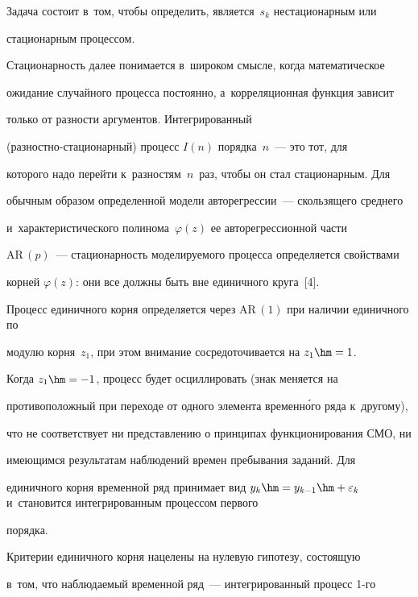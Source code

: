 Задача состоит в~том, чтобы определить, является~$s_k$ нестационарным или 


стационарным процессом. 





     Стационарность далее понимается в~широком смысле, когда математическое 


ожидание случайного процесса постоянно, а~корреляционная функция зависит 


только от раз\-ности аргументов. Интегрированный  


(раз\-ност\-но-ста\-ци\-о\-нар\-ный) процесс $I(n)$ порядка~$n$~--- это тот, для 


которого надо перейти к~разностям~$n$~раз, чтобы он стал стационарным. Для 


обычным образом определенной модели авторегрессии~--- сколь\-зя\-ще\-го сред\-не\-го 


и~характеристического полинома~$\varphi(z)$ ее авторегрессионной части 


$\mathrm{AR}\,(p)$~--- ста\-ци\-о\-нар\-ность моделируемого процесса определяется свойствами 


корней $\varphi(z)$: они все долж\-ны быть вне единичного круга~[4].


     


     Процесс единичного корня определяется через  $\mathrm{AR}\,(1)$ при наличии единичного по 


модулю корня~$z_1$, при этом внимание сосредоточивается на $z_1\hm=1$. 


Когда $z_1\hm=-1$, процесс будет осциллировать (знак меняется на 


противоположный при переходе от одного элемента временн\'{о}го ряда к~другому), 


что не соответствует ни представлению о принципах функционирования СМО, ни 


име\-ющим\-ся результатам наблюдений времен пребывания заданий. Для 


единичного корня временной ряд принимает вид $y_k\hm=  


y_{k-1}\hm+\varepsilon_k$ и~становится интегрированным процессом первого 


порядка. 


     


     Критерии единичного корня нацелены на нулевую гипотезу, состоящую 


в~том, что наблюдаемый временной ряд~--- интегрированный процесс 1-го 


